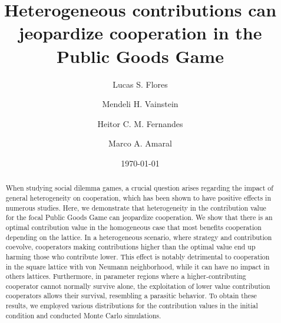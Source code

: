 \documentclass[twocolumn,aps,amsmath,pre,floatfix,superscriptaddress]{revtex4-2}
\begin{document}
\title{Heterogeneous contributions can jeopardize cooperation in the Public Goods Game }


\author{Lucas S. Flores}
\author{Mendeli H. Vainstein}
\author{Heitor C. M. Fernandes}
\address{Instituto de Física, Universidade Federal do Rio Grande do Sul, CP 15051, CEP 91501-970 Porto Alegre - RS, Brazil}
\author{Marco A. Amaral}
\address{Instituto de Humanidades, Artes e Ciências, Universidade Federal do Sul da Bahia, CEP 45638-000, Teixeira de Freitas - BA, Brazil.}


\date{\today}

\begin{abstract}
When studying social dilemma games, a crucial question arises regarding the impact of general heterogeneity on cooperation, which has been shown to have positive effects in numerous studies.
%
Here, we demonstrate that heterogeneity in the contribution value for the focal Public Goods Game can jeopardize cooperation.     
%
We show that there is an optimal contribution value in the homogeneous case that most benefits cooperation depending on the lattice.
%  
In a heterogeneous scenario, where strategy and contribution coevolve, cooperators making contributions higher than the optimal value end up harming those who contribute lower.  
 This effect is notably detrimental to cooperation in the square lattice with von Neumann neighborhood, while it can have no impact in others lattices. 
Furthermore, in parameter regions where a higher-contributing cooperator cannot normally survive alone, the exploitation of lower value contribution cooperators allows their survival, resembling a parasitic behavior.
%
To obtain these results, we employed various distributions for the contribution values in the initial condition and conducted Monte Carlo simulations.        

\end{abstract}

\end{document}
